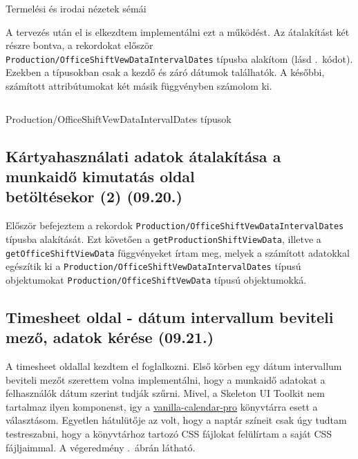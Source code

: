 \documentclass[a4paper]{article}
\newcommand{\inlts}[1]{\texttt{#1}}
\begin{document}
\begin{listing}[!ht]
\inputminted[bgcolor=codebg, breaklines, breakanywhere, fontsize=\small]{typescript}{code/shiftViewData.ts}
\caption{Termelési és irodai nézetek sémái}
\label{listing:shift_view_data}
\end{listing}

A tervezés után el is elkezdtem implementálni ezt a működést. Az átalakítást két részre bontva, a
rekordokat először \inlts{Production/OfficeShiftVewDataIntervalDates} típusba alakítom (lásd
.~kódot). Ezekben a típusokban csak a kezdő és záró dátumok
találhatók. A későbbi, számított attribútumokat két másik függvényben számolom ki.

\begin{listing}[!ht]
\inputminted[bgcolor=codebg, breaklines, breakanywhere, fontsize=\small]{typescript}{code/shiftViewDataIntervalDates.ts}
\caption{Production/OfficeShiftVewDataIntervalDates típusok}
\label{listing:shift_view_data_interval_dates}
\end{listing}

\subsection{Kártyahasználati adatok átalakítása a munkaidő kimutatás oldal\\ betöltésekor (2) (09.20.)}

Először befejeztem a rekordok \inlts{Production/OfficeShiftVewDataIntervalDates}
típusba alakítását. Ezt követően a \inlts{getProductionShiftViewData}, illetve a
\inlts{getOfficeShiftViewData} függvényeket írtam meg, melyek a számított adatokkal egészítik ki a
\inlts{Production/OfficeShiftVewDataIntervalDates} típusú objektumokat
\inlts{Production/OfficeShiftVewData} típusú objektumokká.

\subsection{Timesheet oldal - dátum intervallum beviteli mező, adatok kérése (09.21.)}

A timesheet oldallal kezdtem el foglalkozni. Első körben egy dátum intervallum beviteli mezőt
szerettem volna implementálni, hogy a munkaidő adatokat a felhasználók dátum szerint tudják szűrni.
Mivel, a Skeleton UI Toolkit nem tartalmaz ilyen komponenst, igy a \href{https://vanilla-calendar.pro/}{vanilla-calendar-pro} könyvtárra
esett a választásom. Egyetlen hátulütője az volt, hogy a naptár színeit csak úgy tudtam testreszabni,
hogy a könyvtárhoz tartozó CSS fájlokat felülírtam a saját CSS fájljaimmal. A végeredmény .~ábrán
látható.\\
\end{document}
